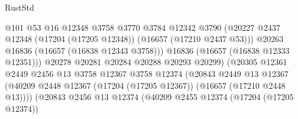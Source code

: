 \begin{lexlean}{RustStd}
\begin{coremodule}
                                            @101
                                            @53
                                            @16
                                            @12348
                                            @3758
                                            @3770
                                            @3784
                                            @12342
                                            @3790
                                            (@20227
                                              @2437
                                              @12348
                                              (@17204 (@17205 @12348))
                                              (@16657 (@17210 @2437 @53)))
                                            @20263
                                            @16836
                                            (@16657 (@16838 @12343 @3758)))
                                          @16836
                                          (@16657 (@16838 @12333 @12351)))
                                        @20278
                                        @20281
                                        @20284
                                        @20288
                                        @20293
                                        @20299)
                                      (@20305
                                        @12361
                                        @2449
                                        @2456
                                        @13
                                        @3758
                                        @12367
                                        @3758
                                        @12374
                                        (@20843
                                          @2449
                                          @13
                                          @12367
                                          (@40209
                                            @2448
                                            @12367
                                            (@17204 (@17205 @12367))
                                            (@16657 (@17210 @2448 @13))))
                                        (@20843
                                          @2456
                                          @13
                                          @12374
                                          (@40209
                                            @2455
                                            @12374
                                            (@17204 (@17205 @12374))

\end{coremodule}
\end{lexlean}
